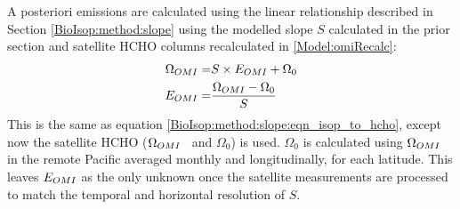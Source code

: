     
    A posteriori emissions are calculated using the linear relationship described in Section \ref{BioIsop:method:slope} using the modelled slope $S$ calculated in the prior section and satellite HCHO columns recalculated in \ref{Model:omiRecalc}:
    \begin{eqnarray} \begin{split}
      \label{BioIsop:method:eqn_Enew}
      \Omega_{OMI} = & S \times E_{OMI} + \Omega_0 \\
      E_{OMI} = & \frac{\Omega_{OMI} - \Omega_{0}}{S}
    \end{split} \end{eqnarray} 
    This is the same as equation \ref{BioIsop:method:slope:eqn_isop_to_hcho}, except now the satellite HCHO ($\Omega_{OMI}$ ~and $\Omega_0$) is used.
    $\Omega_0$ is calculated using $\Omega_{OMI}$ in the remote Pacific averaged monthly and longitudinally, for each latitude.
    This leaves $E_{OMI}$ as the only unknown once the satellite measurements are processed to match the temporal and horizontal resolution of $S$.
    
    
